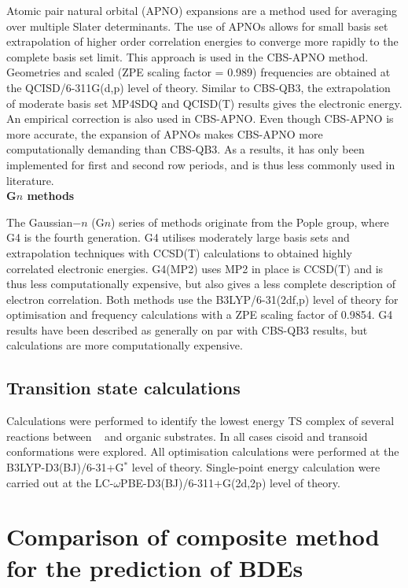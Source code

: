 Atomic pair natural orbital (APNO) expansions are a method used for averaging over multiple Slater determinants. The use of APNOs allows for small basis set extrapolation of higher order correlation energies to converge more rapidly to the complete basis set limit. This approach is used in the CBS-APNO method.\cite{Ochterski1996} Geometries and scaled (ZPE scaling factor = 0.989) frequencies are obtained at the QCISD/6-311G(d,p) level of theory. Similar to CBS-QB3, the extrapolation of moderate basis set MP4SDQ and QCISD(T) results gives the electronic energy. An empirical correction is also used in CBS-APNO. Even though CBS-APNO is more accurate, the expansion of APNOs makes CBS-APNO more computationally demanding than CBS-QB3. As a results, it has only been implemented for first and second row periods, and is thus less commonly used in literature.
\\

\noindent \textbf{G$n$ methods}

The Gaussian$-n$ (G$n$) series of methods originate from the Pople group,\cite{Pople1989} where G4 is the fourth generation. G4 utilises moderately large basis sets and extrapolation techniques with CCSD(T) calculations to obtained highly correlated electronic energies. G4(MP2) uses MP2 in place is CCSD(T) and is thus less computationally expensive, but also gives a less complete description of electron correlation. Both methods use the B3LYP/6-31(2df,p) level of theory for optimisation and frequency calculations with a ZPE scaling factor of 0.9854. G4 results have been described as generally on par with CBS-QB3 results,\cite{Somers2015, Simmie2015} but calculations are more computationally expensive.

\subsection{Transition state calculations}

Calculations were performed to identify the lowest energy TS complex of several reactions between \cumo~ and organic substrates. In all cases cisoid and transoid conformations were explored. All optimisation calculations were performed at the B3LYP-D3(BJ)/6-31+G$^*$ level of theory. Single-point energy calculation were carried out at the LC-$\omega$PBE-D3(BJ)/6-311+G(2d,2p) level of theory.

\section{Comparison of composite method for the prediction of BDEs}

